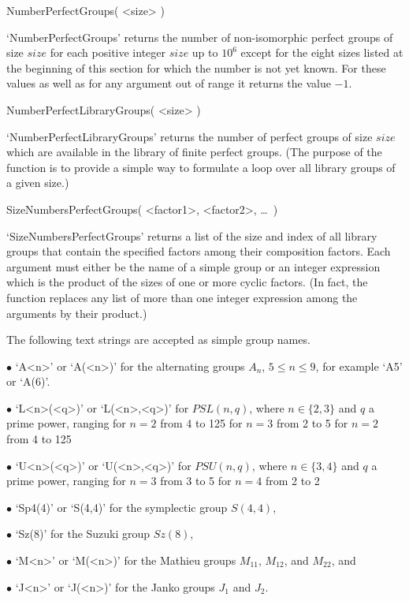 \>NumberPerfectGroups( <size> )

`NumberPerfectGroups' returns the number of non-isomorphic perfect groups
of size $size$ for  each positive integer  $size$ up to $10^6$ except for
the eight  sizes listed at the beginning  of  this section for  which the
number is not yet known. For these values as well as for any argument out
of range it returns the value $-1$.

\>NumberPerfectLibraryGroups( <size> )

`NumberPerfectLibraryGroups' returns the number of perfect groups of size
$size$ which are available in the  library of finite perfect groups. (The
purpose  of the function is  to provide a simple way  to formulate a loop
over all library groups of a given size.)

\>SizeNumbersPerfectGroups( <factor1>, <factor2>, \dots\ )

`SizeNumbersPerfectGroups' returns  a list of the  size and  index of all
library groups that contain the specified factors among their composition
factors. Each argument must either  be the name of a  simple group or  an
integer expression  which is the   product of the sizes   of one or  more
cyclic factors. (In fact, the function replaces any list of more than one
integer expression among the arguments by their product.)

The following text strings are accepted as simple group names.
\beginlist
  \item{$\bullet$} `A<n>' or  `A(<n>)' for the  alternating groups $A_n$,
    $5\leq n\leq9$, for example `A5' or `A(6)'.
  \item{$\bullet$}  `L<n>(<q>)'   or  `L(<n>,<q>)' for  $PSL(n,q)$, where
    $n\in\{2,3\}$ and $q$ a prime power, ranging
    \itemitem{$\circ$} for $n=2$ from 4 to 125
    \itemitem{$\circ$} for $n=3$ from 2 to 5
    \itemitem{$\circ$} for $n=2$ from 4 to 125
  \item{$\bullet$} `U<n>(<q>)'  or  `U(<n>,<q>)' for   $PSU(n,q)$,  where
    $n\in\{3,4\}$ and $q$ a prime power, ranging
    \itemitem{$\circ$} for $n=3$ from 3 to 5
    \itemitem{$\circ$} for $n=4$ from 2 to 2
  \item{$\bullet$} `Sp4(4)' or `S(4,4)' for the symplectic group $S(4,4)$,
  \item{$\bullet$} `Sz(8)' for the Suzuki group $Sz(8)$,
  \item{$\bullet$} `M<n>'  or `M(<n>)' for  the  Mathieu groups $M_{11}$,
    $M_{12}$, and $M_{22}$, and
  \item{$\bullet$} `J<n>' or `J(<n>)'   for  the Janko groups  $J_1$  and
    $J_2$.
\endlist

